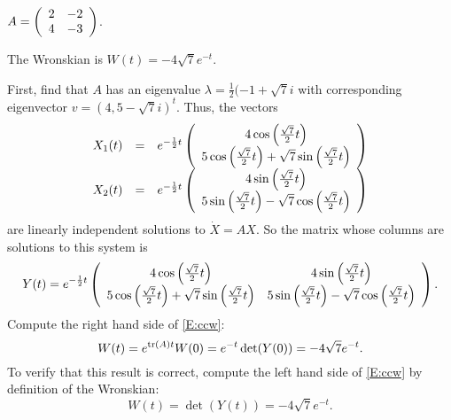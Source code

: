 \documentclass{ximera}
\begin{document}
\begin{exercise} 	\label{c14.w.3c}
$A = \left(\begin{array}{rr} 2 & -2\\ 4 &-3\end{array}\right)$.

\begin{solution}
\ans The Wronskian is $W(t) = -4\sqrt{7}e^{-t}$.

\soln First, find that $A$ has an eigenvalue $\lambda =
\frac{1}{2}(-1 + \sqrt{7}i$ with corresponding
eigenvector $v = (4,5 - \sqrt{7}i)^t$.  Thus, the vectors
\[
\begin{array}{rcl}
X_1(t) & = & e^{-\frac{1}{2}t}\left(\begin{array}{c} 4\cos\left(\frac{\sqrt{7}}{2}t\right) \\ 5\cos\left(\frac{\sqrt{7}}{2}t\right) +
\sqrt{7}\sin\left(\frac{\sqrt{7}}{2}t\right)\end{array}\right) \\
X_2(t) & = & e^{-\frac{1}{2}t}\left(\begin{array}{c} 4\sin\left(\frac{\sqrt{7}}{2}t\right) \\ 5\sin\left(\frac{\sqrt{7}}{2}t\right) -
\sqrt{7}\cos\left(\frac{\sqrt{7}}{2}t\right)\end{array}\right)
\end{array}
\]
are linearly independent solutions to $\dot{X} = AX$.  So the matrix
whose columns are solutions to this system is
\[
Y(t) = e^{-\frac{1}{2}t}\left(\begin{array}{cc} 4\cos\left(\frac{\sqrt{7}}{2}t\right) & 4\sin\left(\frac{\sqrt{7}}{2}t\right)\\ 5\cos\left(\frac{\sqrt{7}}{2}t\right) +
\sqrt{7}\sin\left(\frac{\sqrt{7}}{2}t\right) &5\sin\left(\frac{\sqrt{7}}{2}t\right) -
\sqrt{7}\cos\left(\frac{\sqrt{7}}{2}t\right)\end{array}\right).
\]
Compute the right hand side of \eqref{E:ccw}:
\[
W(t) = e^{{\rm tr}(A)t}W(0) = e^{-t}\det(Y(0)) = -4\sqrt{7}e^{-t}.
\]
To verify that this result is correct, compute the left hand side of
\eqref{E:ccw} by definition of the Wronskian:
\[
W(t) = \det(Y(t)) = -4\sqrt{7}e^{-t}.
\]




\end{solution}
\end{exercise}

 
\end{document}
